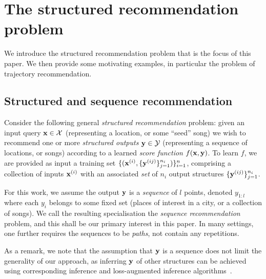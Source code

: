 
\secmoveup
\section{The structured recommendation problem}
\label{sec:recseq}
\textmoveup

We introduce the structured recommendation problem that is the focus of this paper.
We then provide some motivating examples, in particular the problem of trajectory recommendation.

\secmoveup
\subsection{Structured and sequence recommendation}
\label{sec:seqrec-defn}

Consider the following general %
\emph{structured recommendation} problem:
given an input query $\mathbf{x} \in \mathcal{X}$ (representing \eg a location, or some ``seed'' song)
we wish to recommend one or more \emph{structured outputs} $\mathbf{y} \in \mathcal{Y}$ (representing \eg a sequence of locations, or songs)
according to a learned \emph{score function} $f(\mathbf{x},\mathbf{y})$.
To learn $f$,
we are provided as input a training set
$\{ ( \mathbf{x}^{({i})}, \{ \mathbf{y}^{({ij})} \}_{j=1}^{n_i} ) \}_{i=1}^{n}$,
comprising a collection of inputs $\mathbf{x}^{({i})}$ with an associated \emph{set} of $n_i$ output structures $\{ \mathbf{y}^{({ij})} \}_{j=1}^{n_i}$.

For this work, we assume the output $\mathbf{y}$ is a \emph{sequence} of $l$ points, denoted $y_{1:l}$
where each $y_i$ belongs to some fixed set (\eg places of interest in a city, or a collection of songs).
We call the resulting specialisation the \emph{sequence recommendation} problem,
and this shall be our primary interest in this paper.
In many settings, one further requires the sequences to be \emph{paths}, \ie not contain any repetitions.

As a remark, we note that the assumption that $\mathbf{y}$ is a sequence does not limit the generality of our approach,
as inferring $\mathbf{y}$ of other structures can be achieved using corresponding inference and loss-augmented inference algorithms~\cite{joachims2009predicting}.  %


